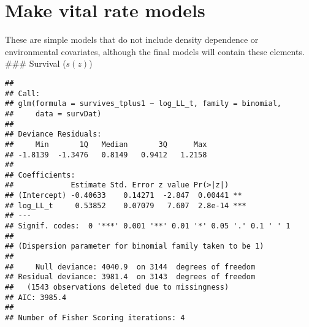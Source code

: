 \documentclass[
]{article}
\newenvironment{Shaded}{\begin{snugshade}}{\end{snugshade}}
\newcommand{\AttributeTok}[1]{\textcolor[rgb]{0.77,0.63,0.00}{#1}}
\newcommand{\DecValTok}[1]{\textcolor[rgb]{0.00,0.00,0.81}{#1}}
\newcommand{\DocumentationTok}[1]{\textcolor[rgb]{0.56,0.35,0.01}{\textbf{\textit{#1}}}}
\newcommand{\FunctionTok}[1]{\textcolor[rgb]{0.00,0.00,0.00}{#1}}
\newcommand{\NormalTok}[1]{#1}
\newcommand{\OtherTok}[1]{\textcolor[rgb]{0.56,0.35,0.01}{#1}}
\newcommand{\SpecialCharTok}[1]{\textcolor[rgb]{0.00,0.00,0.00}{#1}}
\begin{document}
\hypertarget{make-vital-rate-models}{%
\section{Make vital rate models}\label{make-vital-rate-models}}

These are simple models that do not include density dependence or
environmental covariates, although the final models will contain these
elements. \#\#\# Survival (\(s(z)\))

\begin{Shaded}
\end{Shaded}

\begin{verbatim}
## 
## Call:
## glm(formula = survives_tplus1 ~ log_LL_t, family = binomial, 
##     data = survDat)
## 
## Deviance Residuals: 
##     Min       1Q   Median       3Q      Max  
## -1.8139  -1.3476   0.8149   0.9412   1.2158  
## 
## Coefficients:
##             Estimate Std. Error z value Pr(>|z|)    
## (Intercept) -0.40633    0.14271  -2.847  0.00441 ** 
## log_LL_t     0.53852    0.07079   7.607  2.8e-14 ***
## ---
## Signif. codes:  0 '***' 0.001 '**' 0.01 '*' 0.05 '.' 0.1 ' ' 1
## 
## (Dispersion parameter for binomial family taken to be 1)
## 
##     Null deviance: 4040.9  on 3144  degrees of freedom
## Residual deviance: 3981.4  on 3143  degrees of freedom
##   (1543 observations deleted due to missingness)
## AIC: 3985.4
## 
## Number of Fisher Scoring iterations: 4
\end{verbatim}
\end{document}
